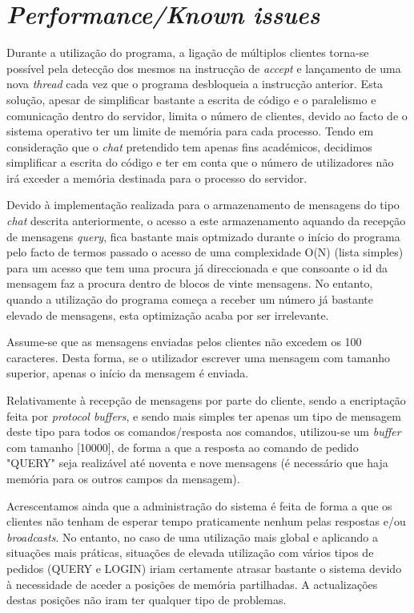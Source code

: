 \documentclass[a4paper]{article}
\begin{document}
\section{\textit{Performance/Known issues}}

Durante a utilização do programa, a ligação de múltiplos clientes torna-se possível pela detecção dos mesmos na instrucção de \textit{accept} e lançamento de uma nova \textit{thread} cada vez que o programa desbloqueia a instrucção anterior. Esta solução, apesar de simplificar bastante a escrita de código e o paralelismo e comunicação dentro do servidor, limita o número de clientes, devido ao facto de o sistema operativo ter um limite de memória para cada processo. Tendo em consideração que o \textit{chat} pretendido tem apenas fins académicos, decidimos simplificar a escrita do código e ter em conta que o número de utilizadores não irá exceder a memória destinada para o processo do servidor.

Devido à implementação realizada para o armazenamento de mensagens do tipo \textit{chat} descrita anteriormente, o acesso a este armazenamento aquando da recepção de mensagens \textit{query}, fica bastante mais optmizado durante o início do programa pelo facto de termos passado o acesso de uma complexidade O(N) (lista simples) para um acesso que tem uma procura já direccionada e que consoante o id da mensagem faz a procura dentro de blocos de vinte mensagens.
No entanto, quando a utilização do programa começa a receber um número já bastante elevado de mensagens, esta optimização acaba por ser irrelevante.

Assume-se que as mensagens enviadas pelos clientes não excedem os 100 caracteres. Desta forma, se o utilizador escrever uma mensagem com tamanho superior, apenas o início da mensagem é enviada.

Relativamente à recepção de mensagens por parte do cliente, sendo a encriptação feita por \textit{protocol buffers}, e sendo mais simples ter apenas um tipo de mensagem deste tipo para todos os comandos/resposta aos comandos, utilizou-se um \textit{buffer} com tamanho [10000], de forma a que a resposta ao comando de pedido "QUERY" seja realizável até noventa e nove mensagens (é necessário que haja memória para os outros campos da mensagem).

Acrescentamos ainda que a administração do sistema é feita de forma a que os clientes não tenham de esperar tempo praticamente nenhum pelas respostas e/ou \textit{broadcasts}. No entanto, no caso de uma utilização mais global e aplicando a situações mais práticas, situações de elevada utilização com vários tipos de pedidos (QUERY e LOGIN) iriam certamente atrasar bastante o sistema devido à necessidade de aceder a posições de memória partilhadas. A actualizações destas posições não iram ter qualquer tipo de problemas.
\end{document}
